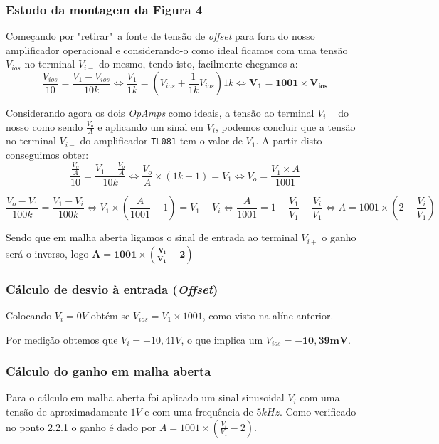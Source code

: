 \documentclass[a4paper]{article}
\begin{document}
        \subsubsection{Estudo da montagem da Figura 4}
            \bigskip
            Começando por "retirar"\ a fonte de tensão de \emph{offset} para fora do nosso amplificador operacional e considerando-o como ideal ficamos com uma tensão $V_{ios}$ no terminal $V_{i-}$ do mesmo, tendo isto, facilmente chegamos a:
            $$\frac{V_{ios}}{10} = \frac{V_1 - V_{ios}}{10k} \Leftrightarrow \frac{V_1}{1k} = (V_{ios} + \frac{1}{1k}V_{ios})1k \Leftrightarrow \bm{V_1 = 1001\times V_{ios}}$$
            
            Considerando agora os dois \emph{OpAmps} como ideais, a tensão ao terminal $V_{i-}$ do nosso como sendo $\frac{V_o}{A}$ e aplicando um sinal em $V_i$, podemos concluir que a tensão no terminal $V_{i-}$ do amplificador \verb|TL081| tem o valor de $V_1$. A partir disto conseguimos obter:
            $$\frac{\frac{V_o}{A}}{10} = \frac{V_1 - \frac{V_o}{A}}{10k} \Leftrightarrow \frac{V_o}{A}\times (1k + 1) = V_1 \Leftrightarrow V_o = \frac{V_1\times A}{1001}$$
            
            $$\frac{V_o - V_1}{100k} = \frac{V_1 - V_i}{100k} \Leftrightarrow V_1\times(\frac{A}{1001} - 1) = V_1 - V_i \Leftrightarrow \frac{A}{1001} = 1 + \frac{V_1}{V_1} - \frac{V_i}{V_1} \Leftrightarrow A = 1001\times (2 - \frac{V_i}{V_1})$$
            
            Sendo que em malha aberta ligamos o sinal de entrada ao terminal $V_{i+}$ o ganho será o inverso, logo $\bm{A = 1001\times (\frac{V_i}{V_1} - 2)}$            
            \medskip
        
        \subsubsection{Cálculo de desvio à entrada (\emph{Offset})}
            \medskip
            Colocando $V_i = 0V$ obtém-se $V_{ios} = V_1\times1001$, como visto na alíne anterior.
            
            Por medição obtemos que $V_i = -10,41V$, o que implica um $V_{ios} = \bm{-10,39mV}$.
            \medskip
        
        \subsubsection{Cálculo do ganho em malha aberta}
            \medskip
            Para o cálculo em malha aberta foi aplicado um sinal sinusoidal $V_i$ com uma tensão de aproximadamente $1V$ e com uma frequência de $5kHz$. Como verificado no ponto 2.2.1 o ganho é dado por $A=1001\times(\frac{V_i}{V_1} - 2)$.
        
\end{document}
